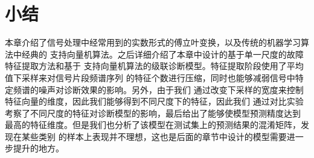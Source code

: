 \section{小结}

本章介绍了信号处理中经常用到的实数形式的傅立叶变换，以及传统的机器学习算法中经典的
支持向量机算法。之后详细介绍了本章中设计的基于单一尺度的故障特征提取方法和基于
支持向量机算法的级联诊断模型。特征提取阶段使用了平均值下采样来对信号片段频谱序列
的特征个数进行压缩，同时也能够减弱信号中特定频谱的噪声对诊断效果的影响。另外，由于我们
通过改变下采样的宽度来控制特征向量的维度，因此我们能够得到不同尺度下的特征，因此我们
通过对比实验考察了不同尺度的特征对诊断模型的影响，最后给出了能够使模型预测精度达到
最高的特征维度。但是我们也分析了该模型在测试集上的预测结果的混淆矩阵，发现在某些类别
的样本上表现并不理想，这也是后面的章节中设计的模型需要进一步提升的地方。
